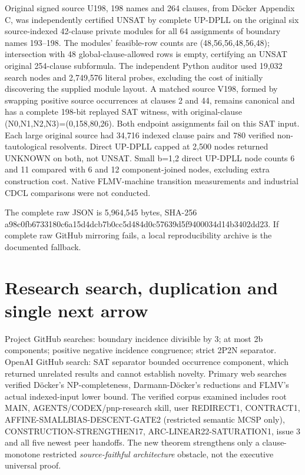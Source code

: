 \documentclass[11pt]{article}
\begin{document}
Original signed source U198, 198 names and 264 clauses, from D\"ocker Appendix C, was independently certified UNSAT by complete UP-DPLL on the original six source-indexed 42-clause private modules for all 64 assignments of boundary names 193--198. The modules' feasible-row counts are (48,56,56,48,56,48); intersection with 48 global-clause-allowed rows is empty, certifying an UNSAT original 254-clause subformula. The independent Python auditor used 19,032 search nodes and 2,749,576 literal probes, excluding the cost of initially discovering the supplied module layout. A matched source V198, formed by swapping positive source occurrences at clauses 2 and 44, remains canonical and has a complete 198-bit replayed SAT witness, with original-clause (N0,N1,N2,N3)=(0,158,80,26). Both endpoint assignments fail on this SAT input. Each large original source had 34,716 indexed clause pairs and 780 verified non-tautological resolvents. Direct UP-DPLL capped at 2,500 nodes returned UNKNOWN on both, not UNSAT. Small b=1,2 direct UP-DPLL node counts 6 and 11 compared with 6 and 12 component-joined nodes, excluding extra construction cost. Native FLMV-machine transition measurements and industrial CDCL comparisons were not conducted.

The complete raw JSON is 5,964,545 bytes, SHA-256 a98c0fb6733180c6a15d4dcb7b0cc5d484d0c57639d5f9400034d14b3402dd23. If complete raw GitHub mirroring fails, a local reproducibility archive is the documented fallback.

\section{Research search, duplication and single next arrow}
Project GitHub searches: boundary incidence divisible by 3; at most 2b components; positive negative incidence congruence; strict 2P2N separator. OpenAI GitHub search: SAT separator bounded occurrence component, which returned unrelated results and cannot establish novelty. Primary web searches verified D\"ocker's NP-completeness, Darmann-D\"ocker's reductions and FLMV's actual indexed-input lower bound. The verified corpus examined includes root MAIN, AGENTS/CODEX/pnp-research skill, user REDIRECT1, CONTRACT1, AFFINE-SMALLBIAS-DESCENT-GATE2 (restricted semantic MCSP only), CONSTRUCTION-STRENGTHEN17, ARC-LINEAR22-SATURATION1, issue 3 and all five newest peer handoffs. The new theorem strengthens only a clause-monotone restricted \emph{source-faithful architecture} obstacle, not the executive universal proof.
\end{document}

